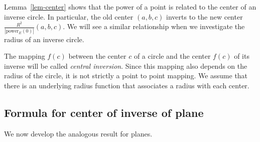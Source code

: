 
Lemma~\ref{lem-center} shows that the power of a point is related to the
center of an inverse circle.
In particular, the old center $(a,b,c)$ inverts to the new center 
$\frac{R^{2}}{|\mbox{power}_{E}(0)|} (a,b,c)$.
We will see a similar relationship
when we investigate the radius of an inverse circle.
%
%
%
\begin{definition}
The mapping $f(c)$ between the center $c$ of a circle and the center $f(c)$ of
its inverse will be called {\em central inversion}.
Since this mapping also depends on the radius of the circle, it is not 
strictly a point to point mapping.
We assume that there is
an underlying radius function that associates a radius with each 
center.
\end{definition}

\subsection{Formula for center of inverse of plane}


We now develop the analogous result for planes.


